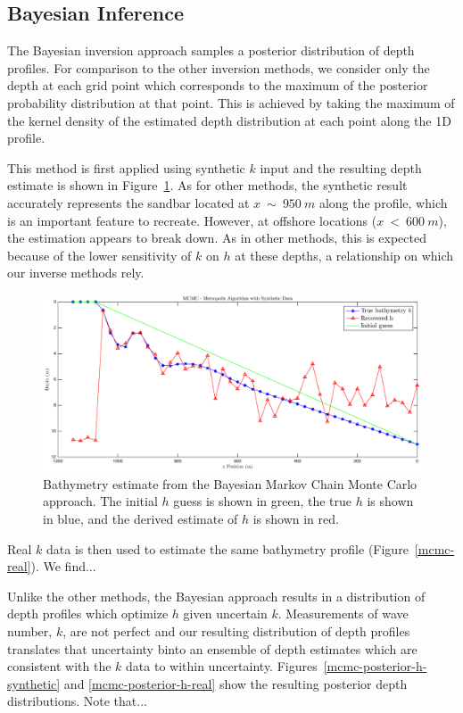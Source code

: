 \subsection{Bayesian Inference}
The Bayesian inversion approach samples a posterior distribution of depth profiles. For comparison to the other inversion methods, we consider only the depth at each grid point which corresponds to the maximum of the posterior probability distribution at that point. This is achieved by taking the maximum of the kernel density of the estimated depth distribution at each point along the 1D profile. 

This method is first applied using synthetic $k$ input and the resulting depth estimate is shown in Figure~\ref{mcmc-synthetic}. As for other methods, the synthetic result accurately represents the sandbar located at $x~\sim~950~m$ along the profile, which is an important feature to recreate. However, at offshore locations ($x~<~600~m$), the estimation appears to break down. As in other methods, this is expected because of the lower sensitivity of $k$ on $h$ at these depths, a relationship on which our inverse methods rely.


\begin{figure}[H]
\center
\includegraphics[scale=0.46]{img/MCMC-manufactured.eps} %
\caption{Bathymetry estimate from the Bayesian Markov Chain Monte Carlo approach. The initial $h$ guess is shown in green, the true $h$ is shown in blue, and the derived estimate of $h$ is shown in red.}
\label{mcmc-synthetic}
\end{figure}

Real $k$ data is then used to estimate the same bathymetry profile (Figure~\ref{mcmc-real}). We find...


Unlike the other methods, the Bayesian approach results in a distribution of depth profiles which optimize $h$ given uncertain $k$. Measurements of wave number, $k$, are not perfect and our resulting distribution of depth profiles translates that uncertainty binto an ensemble of depth estimates which are consistent with the $k$ data to within uncertainty. Figures~\ref{mcmc-posterior-h-synthetic} and \ref{mcmc-posterior-h-real} show the resulting posterior depth distributions. Note that...




